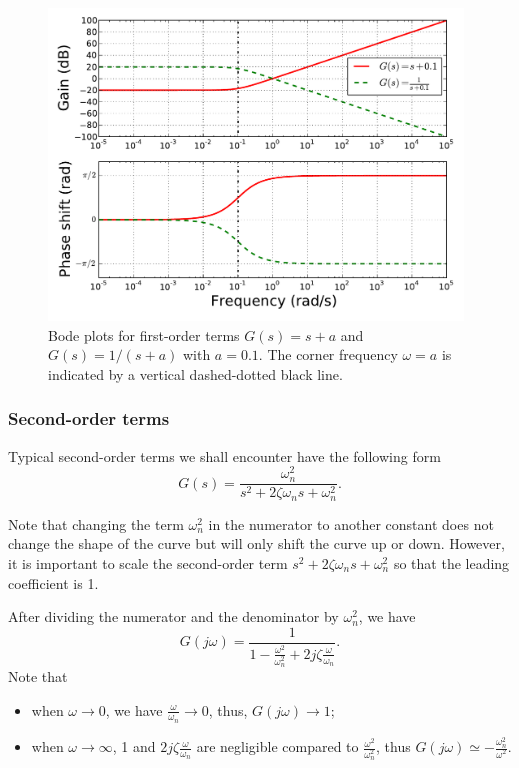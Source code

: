 \documentclass[a4paper,11pt]{report}
\theoremstyle{definition}
\begin{document}
\begin{figure}[H]
  \centering
  \includegraphics[width=11cm]{fig/bode-first.pdf}
  \caption{Bode plots for first-order terms $G(s) = s+a$ and
    $G(s)=1/(s+a)$ with $a=0.1$. The corner frequency $\omega=a$ is
    indicated by a vertical dashed-dotted black line.}
  \label{fig:bode-1st}
\end{figure}


\subsubsection{Second-order terms}

Typical second-order terms we shall encounter have the following form  
\[
G(s) = \frac{\omega_n^2}{s^2+2\zeta\omega_ns+\omega_n^2}.
\]

Note that changing the term $\omega_n^2$ in the numerator to another
constant does not change the shape of the curve but will only shift
the curve up or down. However, it is important to scale the
second-order term $s^2+2\zeta\omega_ns+\omega_n^2$ so that the leading
coefficient is 1.

After dividing the numerator and the denominator by $\omega_n^2$, we
have
\[
G(j\omega) = \frac{1}{1-\frac{\omega^2}{\omega_n^2} +2j\zeta\frac{\omega}{\omega_n}}.
\]
Note that 
\begin{itemize}
\item when $\omega\to 0$, we have $\frac{\omega}{\omega_n} \to 0$,
  thus, $G(j\omega)\to 1$;
\item when  $\omega\to\infty$, 1 and $2j\zeta\frac{\omega}{\omega_n}$
  are negligible compared to $\frac{\omega^2}{\omega_n^2}$, thus
    $G(j\omega)\simeq -\frac{\omega_n^2}{\omega^2}$.
\end{itemize}
\end{document}
